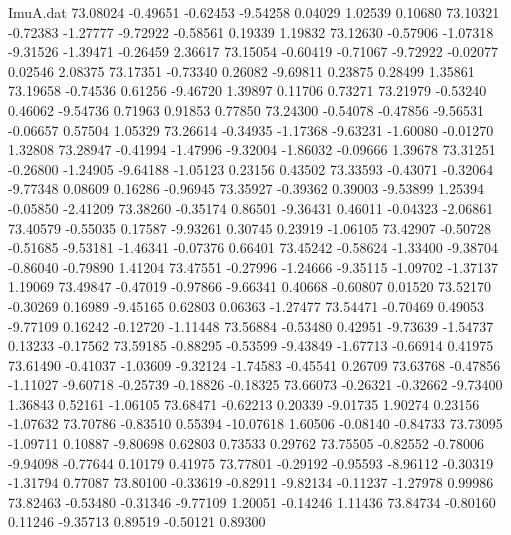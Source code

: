 \begin{filecontents}{ImuA.dat}
  73.08024   -0.49651   -0.62453   -9.54258    0.04029    1.02539    0.10680
  73.10321   -0.72383   -1.27777   -9.72922   -0.58561    0.19339    1.19832
  73.12630   -0.57906   -1.07318   -9.31526   -1.39471   -0.26459    2.36617
  73.15054   -0.60419   -0.71067   -9.72922   -0.02077    0.02546    2.08375
  73.17351   -0.73340    0.26082   -9.69811    0.23875    0.28499    1.35861
  73.19658   -0.74536    0.61256   -9.46720    1.39897    0.11706    0.73271
  73.21979   -0.53240    0.46062   -9.54736    0.71963    0.91853    0.77850
  73.24300   -0.54078   -0.47856   -9.56531   -0.06657    0.57504    1.05329
  73.26614   -0.34935   -1.17368   -9.63231   -1.60080   -0.01270    1.32808
  73.28947   -0.41994   -1.47996   -9.32004   -1.86032   -0.09666    1.39678
  73.31251   -0.26800   -1.24905   -9.64188   -1.05123    0.23156    0.43502
  73.33593   -0.43071   -0.32064   -9.77348    0.08609    0.16286   -0.96945
  73.35927   -0.39362    0.39003   -9.53899    1.25394   -0.05850   -2.41209
  73.38260   -0.35174    0.86501   -9.36431    0.46011   -0.04323   -2.06861
  73.40579   -0.55035    0.17587   -9.93261    0.30745    0.23919   -1.06105
  73.42907   -0.50728   -0.51685   -9.53181   -1.46341   -0.07376    0.66401
  73.45242   -0.58624   -1.33400   -9.38704   -0.86040   -0.79890    1.41204
  73.47551   -0.27996   -1.24666   -9.35115   -1.09702   -1.37137    1.19069
  73.49847   -0.47019   -0.97866   -9.66341    0.40668   -0.60807    0.01520
  73.52170   -0.30269    0.16989   -9.45165    0.62803    0.06363   -1.27477
  73.54471   -0.70469    0.49053   -9.77109    0.16242   -0.12720   -1.11448
  73.56884   -0.53480    0.42951   -9.73639   -1.54737    0.13233   -0.17562
  73.59185   -0.88295   -0.53599   -9.43849   -1.67713   -0.66914    0.41975
  73.61490   -0.41037   -1.03609   -9.32124   -1.74583   -0.45541    0.26709
  73.63768   -0.47856   -1.11027   -9.60718   -0.25739   -0.18826   -0.18325
  73.66073   -0.26321   -0.32662   -9.73400    1.36843    0.52161   -1.06105
  73.68471   -0.62213    0.20339   -9.01735    1.90274    0.23156   -1.07632
  73.70786   -0.83510    0.55394  -10.07618    1.60506   -0.08140   -0.84733
  73.73095   -1.09711    0.10887   -9.80698    0.62803    0.73533    0.29762
  73.75505   -0.82552   -0.78006   -9.94098   -0.77644    0.10179    0.41975
  73.77801   -0.29192   -0.95593   -8.96112   -0.30319   -1.31794    0.77087
  73.80100   -0.33619   -0.82911   -9.82134   -0.11237   -1.27978    0.99986
  73.82463   -0.53480   -0.31346   -9.77109    1.20051   -0.14246    1.11436
  73.84734   -0.80160    0.11246   -9.35713    0.89519   -0.50121    0.89300

\end{filecontents}
